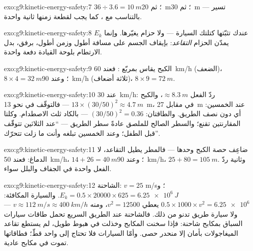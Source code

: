 \begin{solution}{exo:g9:kinetic-energy-safety:7}
$36 \div 3.6 = \qty{10}{m}$؛ ثم \qty{20}{m}؛ ثم \qty{30}{m}
--- تسير بالتناسب مع ، كما يجب لقطعة زمنها ثانية
واحدة.
\end{solution}

\begin{solution}{exo:g9:kinetic-energy-safety:8}
$E_k$ عندك تثبّتها كتلتك  السيارة --- ولا حزام يغيّرها.
وإنما يمدّن الحزام \emph{التقاعد}: بإيقاف الجسم على مسافة
أطول وزمن أطول، برفق، بدل الارتطام بلوحة القيادة دفعة واحدة.
\end{solution}

\begin{solution}{exo:g9:kinetic-energy-safety:9}
الكبح يقاس بمربّع : فعند \qty{60}{km/h} (الضعف)،
$8 \times 4 = \qty{32}{m}$؛ وعند \qty{90}{km/h} (ثلاثة
أضعاف)، $8 \times 9 = \qty{72}{m}$.
\end{solution}

\begin{solution}{exo:g9:kinetic-energy-safety:10}
عند \qty{30}{km/h}: ردّ الفعل $\approx \qty{8.3}{m}$، والكبح
$13 \times (30/50)^2 \approx \qty{4.7}{m}$ --- فالتوقّف في نحو
\qty{13}{m}، في مقابل \qty{27}{m} عند الخمسين: أي دون نصف
الطريق. والطاقتان: $(30/50)^2 = 0.36$ --- بالكاد ثلث 
الاصطدام. وكلتا المقارنتين تقنع؛ والسطر الصالح للملصق عادةً
سطر الطريق --- ``عند الثلاثين تتوقّف قبل الطفل؛ وعند الخمسين
تبلغه وأنت ما زلت تتحرّك''.
\end{solution}

\begin{solution}{exo:g9:kinetic-energy-safety:11}
ضاعِف حصة الكبح وحدها --- فالمطر يطيل التقاعد، لا الدماغ: فعند
\qty{50}{km/h}، $14 + 26 = \qty{40}{m}$؛ وعند \qty{90}{km/h}،
$25 + 80 = \qty{105}{m}$. وثانية ردّ الفعل واحدة في الجفاف
والبلل سواء.
\end{solution}

\begin{solution}{exo:g9:kinetic-energy-safety:12}
الشاحنة: $v = 25$ \unit{m/s}؛ و$E_k = 0.5 \times 20000 \times
625 = \qty{6.25e6}{J}$. والسيارة المكافئة:
$0.5 \times 1000 \times v^2 = \num{6.25e6}$ يعطي
$v^2 = 12500$، ومنه $v \approx \qty{112}{m/s} \approx
\qty{400}{km/h}$ --- ولا سيارة طريق تدنو من ذلك. فالشاحنة عند
 الطريق السريع تحمل طاقات سيارات السباق بمكابح شاحنة:
فإذا سخنت المكابح وخذلت في هبوط طويل، لم يستطع تقاعد
الميغاجولات بأمان إلا منحدر حصى. وأمّا السيارات فلا تحتاج إلى
واحد قطّ؛ فطاقاتها تموت في مكابح عادية.
\end{solution}

